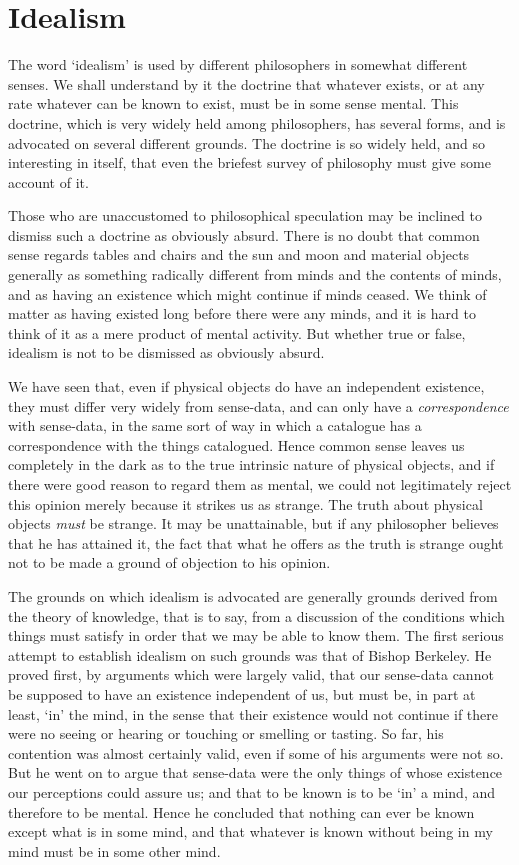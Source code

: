 \documentclass[oneside,letterpaper,12pt]{book}
\begin{document}
\hypertarget{chapter-iv.-idealism}{%
\chapter{Idealism}\label{chapter-iv.-idealism}}

The word `idealism' is used by
different philosophers in somewhat different senses. \label{idealism} We shall understand
by it the doctrine that whatever exists, or at any rate whatever can be
known to exist, must be in some sense mental. This doctrine, which is
very widely held among philosophers, has several forms, and is advocated
on several different grounds. The doctrine is so widely held, and so
interesting in itself, that even the briefest survey of philosophy must
give some account of it.

Those who are unaccustomed to philosophical speculation may be inclined
to dismiss such a doctrine as obviously absurd. There is no doubt that
common sense regards tables and chairs and the sun and moon and material
objects generally as something radically different from minds and the
contents of minds, and as having an existence which might continue if
minds ceased. We think of matter as having existed long before there
were any minds, and it is hard to think of it as a mere product of
mental activity. But whether true or false, idealism is not to be
dismissed as obviously absurd.

We have seen that, even if physical objects do have an independent
existence, they must differ very widely from sense-data, and can only
have a \emph{correspondence} with sense-data, in the same sort of way in
which a catalogue has a correspondence with the things catalogued. Hence
common sense leaves us completely in the dark as to the true intrinsic
nature of physical objects, and if there were good reason to regard them
as mental, we could not legitimately reject this opinion merely because
it strikes us as strange. The truth about physical objects \emph{must}
be strange. It may be unattainable, but if any philosopher believes that
he has attained it, the fact that what he offers as the truth is strange
ought not to be made a ground of objection to his opinion.

The grounds on which idealism is advocated are generally grounds derived
from the theory of knowledge, that is to say, from a discussion of the
conditions which things must satisfy in order that we may be able to
know them. The first serious attempt to establish idealism on such
grounds was that of Bishop Berkeley. He proved first, by arguments which
were largely valid, that our sense-data cannot be supposed to have an
existence independent of us, but must be, in part at least,
`in' the mind, in the sense that their
existence would not continue if there were no seeing or hearing or
touching or smelling or tasting. So far, his contention was almost
certainly valid, even if some of his arguments were not so. But he went
on to argue that sense-data were the only things of whose existence our
perceptions could assure us; and that to be known is to be
`in' a mind, and therefore to be
mental. Hence he concluded that nothing can ever be known except what is
in some mind, and that whatever is known without being in my mind must
be in some other mind.
\end{document}
